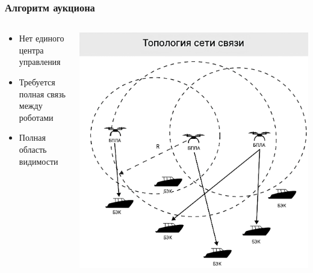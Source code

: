 \documentclass{beamer}
\begin{document}
	\begin{frame}
		\frametitle{Алгоритм аукциона}
		\begin{columns}[T] %
			\begin{column}{0.4\textwidth} %
				\begin{itemize}
					\item Нет единого центра управления
					\item Требуется полная связь между роботами
					\item Полная область видимости
				\end{itemize}
			\end{column}
			\begin{column}{0.6\textwidth} %
				\centering
				\includegraphics[width=\textwidth,height=0.85\textheight,keepaspectratio]{topology_auction.png}
			\end{column}
		\end{columns}
	\end{frame}
\end{document}
